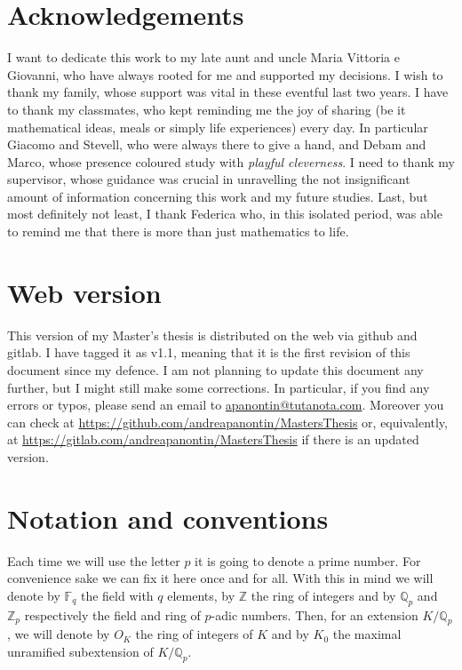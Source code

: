 \section*{Acknowledgements}
I want to dedicate this work to my late aunt and uncle Maria Vittoria e Giovanni,
who have always rooted for me and supported my decisions.
I wish to thank my family, whose support was vital in these eventful last two years.
I have to thank my classmates, who kept reminding me the joy of sharing
(be it mathematical ideas, meals or simply life experiences) every day.
In particular Giacomo and Stevell, who were always there to give a hand, and 
Debam and Marco, whose presence coloured study with \emph{playful cleverness}.
I need to thank my supervisor, whose guidance was crucial in unravelling
the not insignificant amount of information concerning this work and my future studies.
Last, but most definitely not least, I thank Federica who, in this isolated period,
was able to remind me that there is more than just mathematics to life.
\newpage



\section*{Web version}
This version of my Master's thesis is distributed on the web via github and gitlab.
I have tagged it as v1.1, meaning that it is the first revision of this document since
my defence.
I am not planning to update this document any further, but I might still make some corrections.
In particular, if you find any errors or typos, please send an email to
\href{mailto:apanontin@tutanota.com}{apanontin@tutanota.com}.
Moreover you can check at \url{https://github.com/andreapanontin/MastersThesis} or, equivalently,
at \url{https://gitlab.com/andreapanontin/MastersThesis}
if there is an updated version.



\section*{Notation and conventions}
Each time we will use the letter $p$ it is going to denote a prime number.
For convenience sake we can fix it here once and for all.
With this in mind we will denote by $\mathbb{F}_{q}$ the field with $q$ elements,
by $\mathbb{Z}$ the ring of integers and by $\mathbb{Q}_p$ and $\mathbb{Z}_{p}$
respectively the field and ring of $p$-adic numbers.
Then, for an extension $K/\mathbb{Q}_p$, we will denote by $O_K$ the ring of
integers of $K$ and by $K_0$ the maximal unramified subextension of $K/\mathbb{Q}_p$.

